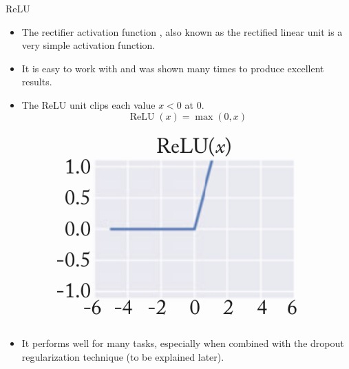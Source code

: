 \documentclass[handout]{beamer}
\begin{document}
\begin{frame}{ReLU}
\begin{scriptsize}
\begin{itemize}
\item The rectifier activation function \cite{glorot2011deep}, also known as the rectified linear unit is a very simple activation function.
\item It is easy to work with and was shown many times to produce excellent results.
\item The ReLU unit clips each value $x < 0$ at $0$.
\begin{displaymath}
 \operatorname{ReLU}(x) = \operatorname{max}(0,x)
\end{displaymath}
\begin{figure}[htb]
	\centering
	 \includegraphics[scale=0.3]{pics/relu.png}
\end{figure}
\item It performs well for many tasks, especially when combined with the dropout regularization technique (to be explained later).
\end{itemize}
\end{scriptsize}
\end{frame}
\end{document}
